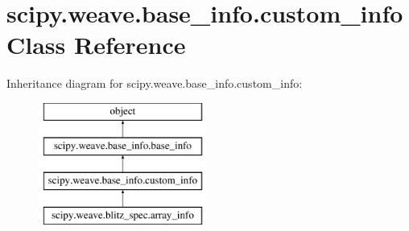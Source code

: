 \hypertarget{classscipy_1_1weave_1_1base__info_1_1custom__info}{}\section{scipy.\+weave.\+base\+\_\+info.\+custom\+\_\+info Class Reference}
\label{classscipy_1_1weave_1_1base__info_1_1custom__info}
Inheritance diagram for scipy.\+weave.\+base\+\_\+info.\+custom\+\_\+info\+:\begin{figure}[H]
\begin{center}
\leavevmode
\includegraphics[height=4.000000cm]{classscipy_1_1weave_1_1base__info_1_1custom__info}
\end{center}
\end{figure}
